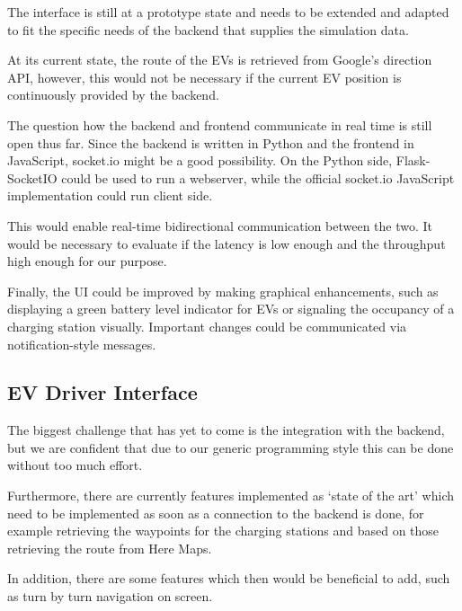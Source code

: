 The interface is still at a prototype state and needs to be extended and adapted to fit the specific needs of the backend that supplies the simulation data.

At its current state, the route of the EVs is retrieved from Google's direction API, however, this would not be necessary if the current EV position is continuously provided by the backend.

The question how the backend and frontend communicate in real time is still open thus far. Since the backend is written in Python and the frontend in JavaScript, socket.io might be a good possibility. On the Python side, Flask-SocketIO could be used to run a webserver, while the official socket.io JavaScript implementation could run client side.

This would enable real-time bidirectional communication between the two. It would be necessary to evaluate if the latency is low enough and the throughput high enough for our purpose.

Finally, the UI could be improved by making graphical enhancements, such as displaying a green battery level indicator for EVs or signaling the occupancy of a charging station visually. Important changes could be communicated via notification-style messages.

\subsection{EV Driver Interface}

The biggest challenge that has yet to come is the integration with the backend, but we are confident that due to our generic programming style this can be done without too much effort.

Furthermore, there are currently features implemented as `state of the art' which need to be implemented as soon as a connection to the backend is done, for example retrieving the waypoints for the charging stations and based on those retrieving the route from Here Maps.

In addition, there are some features which then would be beneficial to add, such as turn by turn navigation on screen.
